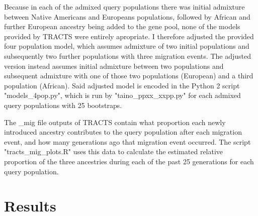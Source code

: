 \documentclass[11pt]{article}
\begin{document}
Because in each of the admixed query populations there was initial admixture between Native Americans and Europeans populations, followed by African and further European ancestry being added to the gene pool, none of the models provided by TRACTS were entirely apropriate. I therefore adjusted the provided four population model, which assumes admixture of two initial populations and subsequently two further populations with three migration events. The adjusted version instead assumes initial admixture between two populations and subsequent admixture with one of those two populations (European) and a third population (African). Said adjusted model is encoded in the Python 2 script "models\_4pop.py", which is run by "taino\_ppxx\_xxpp.py" for each admixed query populations with 25 bootstraps.

The \_mig file outputs of TRACTS contain what proportion each newly introduced ancestry contributes to the query population after each migration event, and how many generations ago that migration event occurred. The script "tracts\_mig\_plots.R" uses this data to calculate the estimated relative proportion of the three ancestries during each of the past 25 generations for each query population. 







\vspace{8mm}
\section{Results}


\end{document}
